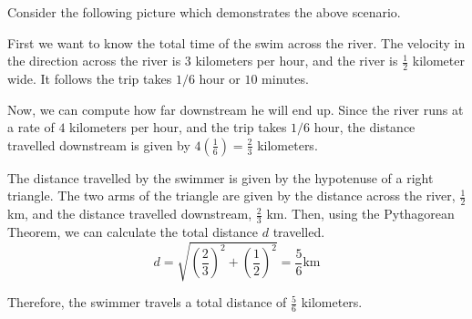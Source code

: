 \begin{solution}
Consider the following picture which demonstrates the above scenario. 

\begin{center}
\end{center}

First we want to know the total time of the swim across the river. 
The velocity in the direction across the river is
$3$ kilometers per hour, and the river is $\frac{1}{2}$ kilometer wide. It follows the trip
takes $1/6$ hour or $10$ minutes. 

Now, we can compute how far downstream he will end up. Since the river runs at a rate of 
$4$ kilometers per hour, and the trip takes $1/6$ hour, the distance travelled downstream 
is given by $4 \left(\frac{1}{6}\right) = \frac{2}{3}$ kilometers. 

The distance travelled by the swimmer is given by the hypotenuse of a right triangle. 
The two arms of the triangle are given by the distance across the river, $\frac{1}{2}$km, and 
the distance travelled downstream, $\frac{2}{3}$ km. Then, using the Pythagorean Theorem, we can calculate
the total distance $d$ travelled.
\begin{equation*}
d
=
\sqrt{ \left(\frac{2}{3} \right)^2 + \left( \frac{1}{2} \right) ^2 }
=
\frac{5}{6} \mbox{km}
\end{equation*}

Therefore, the swimmer travels a total distance of $\frac{5}{6}$ kilometers. 
\end{solution}
